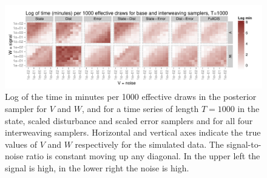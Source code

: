 \documentclass{article}\usepackage[]{graphicx}\usepackage[]{color}
\newenvironment{knitrout}{}{} %
\begin{document}
\begin{knitrout}
\color{fgcolor}\begin{figure}[]


{\centering \includegraphics[width=.8\textwidth]{figure/plot} 

}

\caption[Log of the time in minutes per 1000 effective draws in the posterior sampler for $V$ and $W$, and for a time series of length $T=1000$ in the state, scaled disturbance and scaled error samplers and for all four interweaving samplers]{Log of the time in minutes per 1000 effective draws in the posterior sampler for $V$ and $W$, and for a time series of length $T=1000$ in the state, scaled disturbance and scaled error samplers and for all four interweaving samplers. Horizontal and vertical axes indicate the true values of $V$ and $W$ respectively for the simulated data. The signal-to-noise ratio is constant moving up any diagonal. In the upper left the signal is high, in the lower right the noise is high.\label{plot}}
\end{figure}


\end{knitrout}




\end{document}
